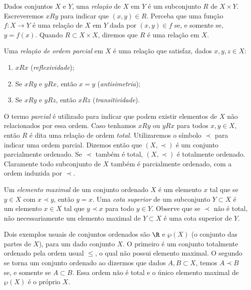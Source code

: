 Dados conjuntos \( X \) e \( Y \), uma \emph{relação} de \( X \) em \( Y \) é um subconjunto \( R \) de \( X \times Y \). 
Escreveremos \( x R y \) para indicar que \( ( x, y ) \in R \).
Perceba que uma função \( f : X \to Y \) é uma relação de \( X \) em \( Y \) dada por \( ( x, y ) \in f \) se, e somente se, \( y = f(x) \).
Quando \( R \subset X \times X \), diremos que \( R \) é uma relação em \( X \).

Uma \emph{relação de ordem parcial} em \( X \) é uma relação que satisfaz, dados \( x, y, z \in X \):
\begin{enumerate}[label=\roman*)]
    \item \( x R x \) (\emph{reflexividade});
    \item Se \( x R y \) e \( y R x \), então \( x = y \) (\emph{antisimetria});
    \item Se \( x R y \) e \( y R z \), então \( x R z \) (\emph{transitividade}).
\end{enumerate}
O termo \emph{parcial} é utilizado para indicar que podem existir elementos de \( X \) não relacionados por essa ordem.
Caso tenhamos \( x R y \) ou \( y R x \) para todos \( x, y \in X \), então \( R \) é dita uma relação de ordem \emph{total}.
Utilizaremos o símbolo \( \prec \) para indicar uma ordem parcial.
Dizemos então que \( ( X, \prec ) \) é um conjunto parcialmente ordenado.
Se \( \prec \) também é total, \( ( X, \prec ) \) é totalmente ordenado.
Claramente todo subconjunto de \( X \) também é parcialmente ordenado, com a ordem induzida por \( \prec \).

Um \emph{elemento maximal} de um conjunto ordenado \( X \) é um elemento \( x \) tal que se \( y \in X \) com \( x \prec y \), então \( y = x \).
Uma \emph{cota superior} de um subconjunto \( Y \subset X \) é um elemento \( x \in X \) tal que \( y \prec x \) para todo \( y \in Y \).
Observe que se \( \prec \) não é total, não necessariamente um elemento maximal de \( Y \subset X \) é uma cota superior de \( Y \).

Dois exemplos usuais de conjuntos ordenados são \( \R \) e \( \wp ( X ) \) (o conjunto das partes de \( X \)), para um dado conjunto \( X \).
O primeiro é um conjunto totalmente ordenado pela ordem usual \( \leq \), o qual não possui elemento maximal.
O segundo se torna um conjunto ordenado ao dizermos que dados \( A, B \subset X \), temos \( A \prec B \) se, e somente se \( A \subset  B \).
Essa ordem não é total e o único elemento maximal de \( \wp ( X ) \) é o próprio \( X \).


